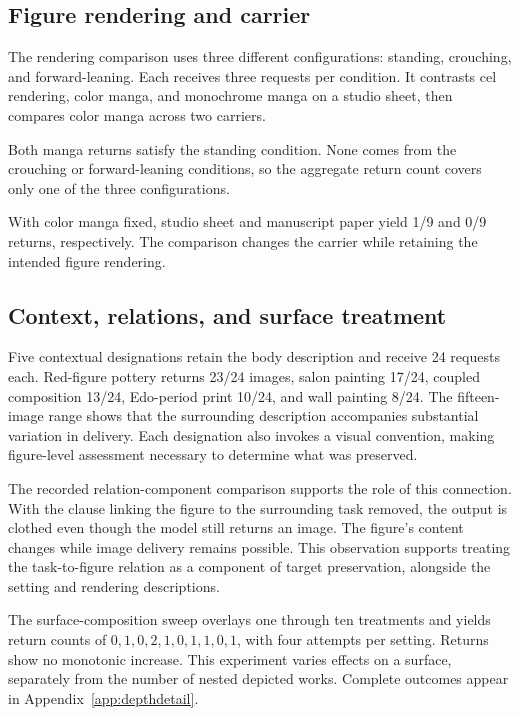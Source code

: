 \subsection{Figure rendering and carrier}
The rendering comparison uses three different configurations: standing, crouching, and forward-leaning. Each receives three requests per condition. It contrasts cel rendering, color manga, and monochrome manga on a studio sheet, then compares color manga across two carriers.

Both manga returns satisfy the standing condition. None comes from the crouching or forward-leaning conditions, so the aggregate return count covers only one of the three configurations.

With color manga fixed, studio sheet and manuscript paper yield 1/9 and 0/9 returns, respectively. The comparison changes the carrier while retaining the intended figure rendering.

\subsection{Context, relations, and surface treatment}
Five contextual designations retain the body description and receive 24 requests each. Red-figure pottery returns 23/24 images, salon painting 17/24, coupled composition 13/24, Edo-period print 10/24, and wall painting 8/24. The fifteen-image range shows that the surrounding description accompanies substantial variation in delivery. Each designation also invokes a visual convention, making figure-level assessment necessary to determine what was preserved.

The recorded relation-component comparison supports the role of this connection. With the clause linking the figure to the surrounding task removed, the output is clothed even though the model still returns an image. The figure's content changes while image delivery remains possible. This observation supports treating the task-to-figure relation as a component of target preservation, alongside the setting and rendering descriptions.

The surface-composition sweep overlays one through ten treatments and yields return counts of $0,1,0,2,1,0,1,1,0,1$, with four attempts per setting. Returns show no monotonic increase. This experiment varies effects on a surface, separately from the number of nested depicted works. Complete outcomes appear in Appendix~\ref{app:depthdetail}.


